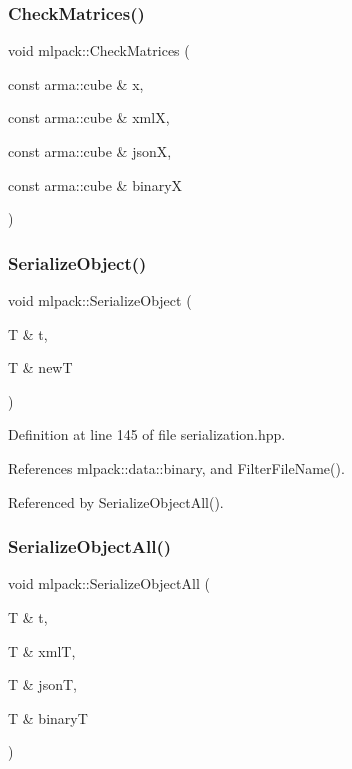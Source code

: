 \mbox{\label{namespacemlpack_ab4fe0775386b425fea62ba70709cbc47}} 
\subsubsection{Check\+Matrices()\hspace{0.1cm}{\footnotesize\ttfamily [3/3]}}
{\footnotesize\ttfamily void mlpack\+::\+Check\+Matrices (\begin{DoxyParamCaption}\item[{const arma\+::cube \&}]{x,  }\item[{const arma\+::cube \&}]{xmlX,  }\item[{const arma\+::cube \&}]{jsonX,  }\item[{const arma\+::cube \&}]{binaryX }\end{DoxyParamCaption})}

\mbox{\label{namespacemlpack_a60e0769fd629305e7b5ea41569bc64ae}} 
\subsubsection{Serialize\+Object()}
{\footnotesize\ttfamily void mlpack\+::\+Serialize\+Object (\begin{DoxyParamCaption}\item[{T \&}]{t,  }\item[{T \&}]{newT }\end{DoxyParamCaption})}



Definition at line 145 of file serialization.\+hpp.



References mlpack\+::data\+::binary, and Filter\+File\+Name().



Referenced by Serialize\+Object\+All().

\mbox{\label{namespacemlpack_a8c171c8ee3d09fb7f38f9a76b9a962b8}} 
\subsubsection{Serialize\+Object\+All()}
{\footnotesize\ttfamily void mlpack\+::\+Serialize\+Object\+All (\begin{DoxyParamCaption}\item[{T \&}]{t,  }\item[{T \&}]{xmlT,  }\item[{T \&}]{jsonT,  }\item[{T \&}]{binaryT }\end{DoxyParamCaption})}



